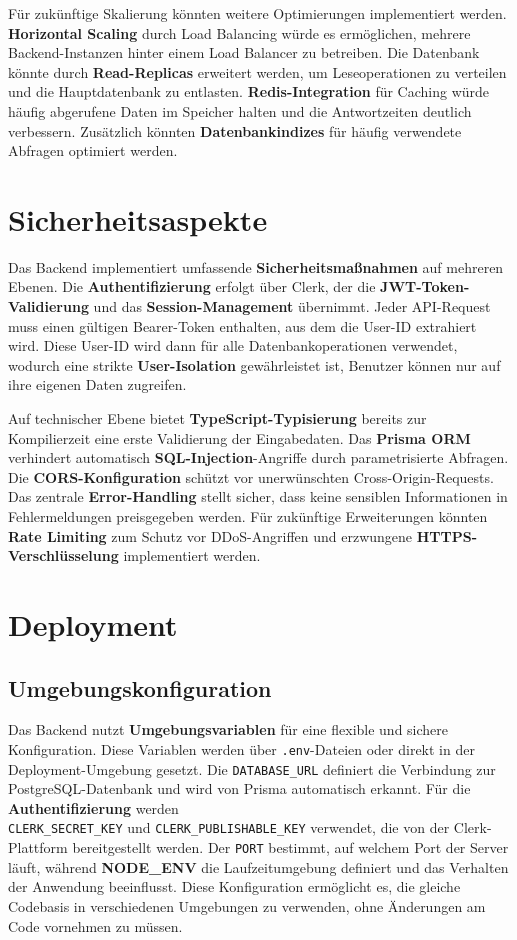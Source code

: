Für zukünftige Skalierung könnten weitere Optimierungen implementiert werden. \textbf{Horizontal Scaling} durch Load Balancing würde es ermöglichen, mehrere Backend-Instanzen hinter einem Load Balancer zu betreiben. Die Datenbank könnte durch \textbf{Read-Replicas} erweitert werden, um Leseoperationen zu verteilen und die Hauptdatenbank zu entlasten. \textbf{Redis-Integration} für Caching würde häufig abgerufene Daten im Speicher halten und die Antwortzeiten deutlich verbessern. Zusätzlich könnten \textbf{Datenbankindizes} für häufig verwendete Abfragen optimiert werden.

\section{Sicherheitsaspekte}

Das Backend implementiert umfassende \textbf{Sicherheitsmaßnahmen} auf mehreren Ebenen. Die \textbf{Authentifizierung} erfolgt über Clerk, der die \textbf{JWT-Token-Validierung} und das \textbf{Session-Management} übernimmt. Jeder API-Request muss einen gültigen Bearer-Token enthalten, aus dem die User-ID extrahiert wird. Diese User-ID wird dann für alle Datenbankoperationen verwendet, wodurch eine strikte \textbf{User-Isolation} gewährleistet ist, Benutzer können nur auf ihre eigenen Daten zugreifen.

Auf technischer Ebene bietet \textbf{TypeScript-Typisierung} bereits zur Kompilierzeit eine erste Validierung der Eingabedaten. Das \textbf{Prisma ORM} verhindert automatisch \textbf{SQL-Injection}-Angriffe durch parametrisierte Abfragen. Die \textbf{CORS-Konfiguration} schützt vor unerwünschten Cross-Origin-Requests. Das zentrale \textbf{Error-Handling} stellt sicher, dass keine sensiblen Informationen in Fehlermeldungen preisgegeben werden. Für zukünftige Erweiterungen könnten \textbf{Rate Limiting} zum Schutz vor DDoS-Angriffen und erzwungene \textbf{HTTPS-Verschlüsselung} implementiert werden.

\section{Deployment}

\subsection{Umgebungskonfiguration}

Das Backend nutzt \textbf{Umgebungsvariablen} für eine flexible und sichere Konfiguration. Diese Variablen werden über \texttt{.env}-Dateien oder direkt in der Deployment-Umgebung gesetzt. Die \texttt{DATABASE\_URL} definiert die Verbindung zur PostgreSQL-Datenbank und wird von Prisma automatisch erkannt. Für die \textbf{Authentifizierung} werden\\ \texttt{CLERK\_SECRET\_KEY} und \texttt{CLERK\_PUBLISHABLE\_KEY} verwendet, die von der Clerk-Plattform bereitgestellt werden. Der \texttt{PORT} bestimmt, auf welchem Port der Server läuft, während \textbf{NODE\_ENV} die Laufzeitumgebung definiert und das Verhalten der Anwendung beeinflusst. Diese Konfiguration ermöglicht es, die gleiche Codebasis in verschiedenen Umgebungen zu verwenden, ohne Änderungen am Code vornehmen zu müssen.

